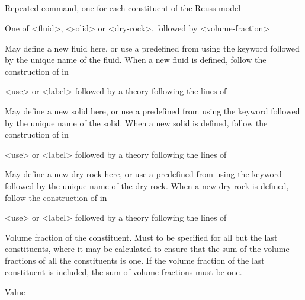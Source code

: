 {\subparagraph{}
 \slist
   \item \Description Repeated command, one for each constituent of the Reuss model
   \item \Argument One of <fluid>, <solid> or <dry-rock>, followed by <volume-fraction>
   \item \Default
 \elist

 \slist
   \item \Description May define a new fluid here, or use a predefined  from  using the keyword  followed by the unique name of the fluid. When a new fluid is defined, follow the construction of  in 
   \item \Argument <use> or <label> followed by a theory following the lines of 
   \item \Default
 \elist

 \slist
   \item \Description May define a new solid here, or use a predefined  from  using the keyword  followed by the unique name of the solid. When a new solid is defined, follow the construction of  in 
   \item \Argument <use> or <label> followed by a theory following the lines of 
   \item \Default
 \elist

 \slist
   \item \Description  May define a new dry-rock here, or use a predefined  from  using the keyword  followed by the unique name of the dry-rock. When a new dry-rock is defined, follow the construction of  in 
   \item \Argument <use> or <label> followed by a theory following the lines of 
   \item \Default
 \elist

 \slist
   \item \Description Volume fraction of the constituent. Must to be specified for all but the last constituents, where it may be calculated to ensure that the sum of the volume fractions of all the constituents is one. If the volume fraction of the last constituent is included, the sum of volume fractions must be one. 
   \item \Argument Value
   \item \Default
 \elist

}
